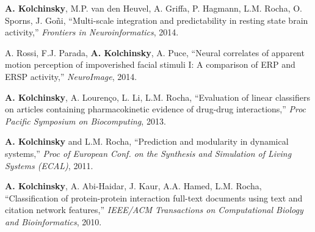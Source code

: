 \textbf{A. Kolchinsky}, M.P. van den Heuvel, A. Griffa, P. Hagmann, L.M. Rocha, O. Sporns, J. Goñi, ``Multi-scale
integration and predictability in resting state brain activity,'' 
\emph{Frontiers in Neuroinformatics}, 2014. 
 

A. Rossi, F.J. Parada, \textbf{A. Kolchinsky}, A. Puce, ``Neural correlates of apparent motion perception of impoverished facial stimuli I: A comparison of ERP and ERSP activity,'' \emph{NeuroImage}, 2014. 
 

\textbf{A. Kolchinsky}, A. Lourenço, L. Li, L.M. Rocha, ``Evaluation of linear classifiers on articles containing pharmacokinetic evidence of drug-drug interactions,'' \emph{Proc Pacific Symposium on Biocomputing}, 2013. 
 

\textbf{A. Kolchinsky} and L.M. Rocha, ``Prediction and modularity in dynamical systems,'' \emph{Proc
of European Conf. on the Synthesis and Simulation of Living Systems (ECAL)}, 2011. 
 

\textbf{A. Kolchinsky}, A. Abi-Haidar, J. Kaur, A.A. Hamed, L.M. Rocha, ``Classification of protein-protein interaction full-text documents using text and citation network features,'' \emph{IEEE/ACM Transactions on Computational Biology and Bioinformatics}, 2010. 
 

